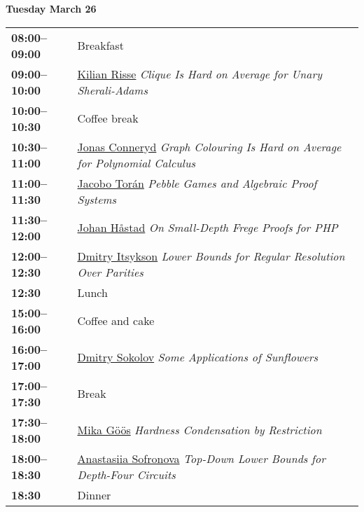 \documentclass[11pt]{article}
\newcommand{\scheduletablewidth}{5.06in}
\begin{document}
\noindent\begin{minipage}{\textwidth}
\begin{center} {\bf\large Tuesday March 26} \end{center}
\begin{tabular}{ p{0.9in} p{\scheduletablewidth} }
{\bf 08:00--09:00}  & Breakfast\\

{\bf 09:00--10:00} & \hyperref[Risse]{Kilian Risse}
{\em Clique Is Hard on Average for Unary Sherali-Adams} \\

{\bf 10:00--10:30} & {Coffee break} \\

{\bf 10:30--11:00} & \hyperref[Conneryd]{Jonas Conneryd}
{\em Graph Colouring Is Hard on Average for Polynomial Calculus} \\

{\bf 11:00--11:30} & \hyperref[Toran]{Jacobo Tor\'{a}n}
{\em Pebble Games and Algebraic Proof Systems} \\

{\bf 11:30--12:00} & \hyperref[Hastad]{Johan H\aa stad}
{\em On Small-Depth Frege Proofs for PHP} \\

{\bf 12:00--12:30} & \hyperref[Itsykson]{Dmitry Itsykson}
{\em Lower Bounds for Regular Resolution Over Parities} \\



{\bf 12:30%
} &  Lunch\\

{\bf 15:00--16:00} &  Coffee and cake \\

{\bf 16:00--17:00} & \hyperref[Sokolov]{Dmitry Sokolov}
{\em Some Applications of Sunflowers} \\

{\bf 17:00--17:30} & {Break} \\

{\bf 17:30--18:00} & \hyperref[Goos]{Mika G\"{o}\"{o}s}
{\em Hardness Condensation by Restriction} \\

{\bf 18:00--18:30} & \hyperref[Sofronova]{Anastasiia Sofronova}
{\em Top-Down Lower Bounds for Depth-Four Circuits} \\

{\bf 18:30%
} & Dinner \\
\end{tabular}
\end{minipage}
\end{document}
